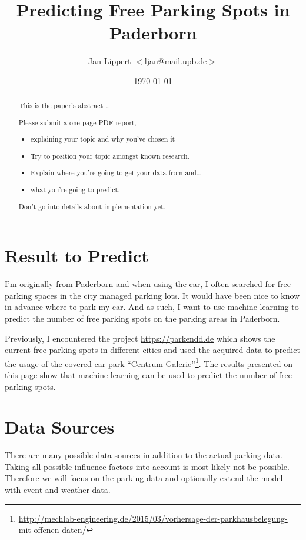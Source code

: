 \documentclass[journal,10pt]{IEEEtran}
\title{Predicting Free Parking Spots in Paderborn}
\author{Jan Lippert \(<\)\href{mailt:ljan@mail.upb.de}{ljan@mail.upb.de}\(>\)}
\date{\today}
\begin{document}
\maketitle

\begin{abstract}
This is the paper's abstract \ldots

Please submit a one-page PDF report, 

\begin{itemize}
  \item explaining your topic and why you've chosen it
  \item Try to position your topic amongst known research.
  \item Explain where you're going to get your data from and\ldots
  \item what you're going to predict.
\end{itemize}

Don't go into details about implementation yet.
\end{abstract}

\section{Result to Predict}
I'm originally from Paderborn and when using the car, I often searched for free parking spaces in the city managed parking lots. It would have been nice to know in advance where to park my car. And as such, I want to use machine learning to predict the number of free parking spots on the parking areas in Paderborn.

Previously, I encountered the project \url{https://parkendd.de} which shows the current free parking spots in different cities and used the acquired data to predict the usage of the covered car park ``Centrum Galerie''\footnote{\url{http://mechlab-engineering.de/2015/03/vorhersage-der-parkhausbelegung-mit-offenen-daten/}}. The results presented on this page show that machine learning can be used to predict the number of free parking spots.

\section{Data Sources}\label{data sources}
There are many possible data sources in addition to the actual parking data. Taking all possible influence factors into account is most likely not be possible. Therefore we will focus on the parking data and optionally extend the model with event and weather data.
\end{document}

